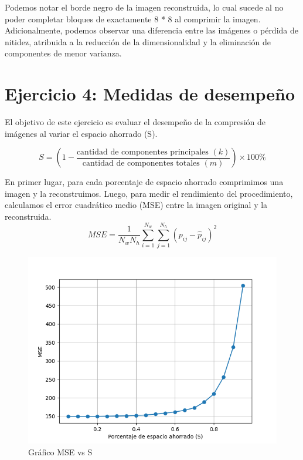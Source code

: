 \documentclass[a4paper,12pt]{article}
\begin{document}
Podemos notar el borde negro de la imagen reconstruida, lo cual sucede al no poder completar bloques de exactamente 8 * 8 al comprimir la imagen.
Adicionalmente, podemos observar una diferencia entre las imágenes o pérdida de nitidez, atribuida a la reducción de la dimensionalidad y la eliminación de componentes de menor varianza.

\newpage
\section*{Ejercicio 4: Medidas de desempeño}
El objetivo de este ejercicio es evaluar el desempeño de la compresión de imágenes al variar el espacio ahorrado (S). 

\begin{equation}
S = \left( 1 - \frac{\text{cantidad de componentes principales } (k)}{\text{cantidad de componentes totales } (m)} \right) \times 100 \%
\end{equation}

En primer lugar, para cada porcentaje de espacio ahorrado comprimimos una imagen y la reconstruimos. Luego, para 
medir el rendimiento del procedimiento, calculamos el error cuadrático medio (MSE) entre la imagen original y 
la reconstruida. 
\begin{equation}
MSE = \frac{1}{N_w N_h} \sum_{i=1}^{N_w} \sum_{j=1}^{N_h} (p_{ij} - \hat{p}_{ij})^2
\end{equation}

\begin{figure}[H]
    \centering
    \includegraphics[width=1\textwidth]{Ejercicio 4a.png}
    \caption{Gráfico MSE vs S}
    \label{fig:ej4}
\end{figure}
\end{document}
